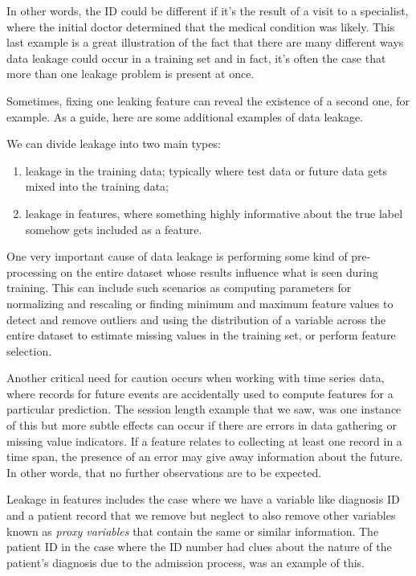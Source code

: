 \begin{multicols}{2}
In other words, the ID could be different if it's the result of a visit to a specialist, where the initial doctor determined that the medical condition was likely. This last example is a great illustration of the fact that there are many different ways data leakage could occur in a training set and in fact, it's often the case that more than one leakage problem is present at once. 

Sometimes, fixing one leaking feature can reveal the existence of a second one, for example. As a guide, here are some additional examples of data leakage. 

We can divide leakage into two main types: 
\begin{enumerate}
\item leakage in the training data; typically where test data or future data gets mixed into the training data;
\item leakage in features, where something highly informative about the true label somehow gets included as a feature. 
\end{enumerate}

One very important cause of data leakage is performing some kind of pre-processing on the entire dataset whose results influence what is seen during training. This can include such scenarios as computing parameters for normalizing and rescaling or finding minimum and maximum feature values to detect and remove outliers and using the distribution of a variable across the entire dataset to estimate missing values in the training set, or perform feature selection. 

Another critical need for caution occurs when working with time series data, where records for future events are accidentally used to compute features for a particular prediction. The session length example that we saw, was one instance of this but more subtle effects can occur if there are errors in data gathering or missing value indicators. If a feature relates to collecting at least one record in a time span, the presence of an error may give away information about the future. In other words, that no further observations are to be expected. 

Leakage in features includes the case where we have a variable like diagnosis ID and a patient record that we remove but neglect to also remove other variables known as \emph{proxy variables} that contain the same or similar information. The patient ID in the case where the ID number had clues about the nature of the patient's diagnosis due to the admission process, was an example of this.


\end{multicols}
